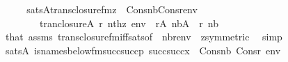 \begin{isabellebody}
%
\isadelimproof
%
\endisadelimproof
%
\isatagproof
{}\isamarkupfalse%
\ {\isacharminus}{\kern0pt}\isanewline
\ \ \isamarkupfalse%
\ {\isachardoublequoteopen}sats{\isacharparenleft}{\kern0pt}A{\isacharcomma}{\kern0pt}trans{\isacharunderscore}{\kern0pt}closure{\isacharunderscore}{\kern0pt}fm{\isacharparenleft}{\kern0pt}{}{\isacharcomma}{\kern0pt}z\ {\isacharhash}{\kern0pt}{\isacharplus}{\kern0pt}\ {}{\isacharparenright}{\kern0pt}{\isacharcomma}{\kern0pt}Cons{\isacharparenleft}{\kern0pt}nb{\isacharcomma}{\kern0pt}Cons{\isacharparenleft}{\kern0pt}r{\isacharcomma}{\kern0pt}env{\isacharparenright}{\kern0pt}{\isacharparenright}{\kern0pt}{\isacharparenright}{\kern0pt}\ {\isasymlongleftrightarrow}\isanewline
\ \ \ \ \ \ \ \ tran{\isacharunderscore}{\kern0pt}closure{\isacharparenleft}{\kern0pt}{\isacharhash}{\kern0pt}{\isacharhash}{\kern0pt}A{\isacharcomma}{\kern0pt}\ r{\isacharcomma}{\kern0pt}\ nth{\isacharparenleft}{\kern0pt}z{\isacharcomma}{\kern0pt}\ env{\isacharparenright}{\kern0pt}{\isacharparenright}{\kern0pt}{\isachardoublequoteclose}\ \ {\isachardoublequoteopen}r{\isasymin}A{\isachardoublequoteclose}\ {\isachardoublequoteopen}nb{\isasymin}A{\isachardoublequoteclose}\ \ r\ nb\isanewline
\ \ \ \ \isamarkupfalse%
\ that\ assms\ trans{\isacharunderscore}{\kern0pt}closure{\isacharunderscore}{\kern0pt}fm{\isacharunderscore}{\kern0pt}iff{\isacharunderscore}{\kern0pt}sats{\isacharbrackleft}{\kern0pt}of\ {}\ {\isachardoublequoteopen}{\isacharbrackleft}{\kern0pt}nb{\isacharcomma}{\kern0pt}r{\isacharbrackright}{\kern0pt}{\isacharat}{\kern0pt}env{\isachardoublequoteclose}\ {\isacharunderscore}{\kern0pt}\ {\isachardoublequoteopen}z{\isacharhash}{\kern0pt}{\isacharplus}{\kern0pt}{}{\isachardoublequoteclose}{\isacharcomma}{\kern0pt}symmetric{\isacharbrackright}{\kern0pt}\ \isamarkupfalse%
\ simp\isanewline
\ \ \isamarkupfalse%
\isanewline
\ \ \isamarkupfalse%
\ {\isachardoublequoteopen}sats{\isacharparenleft}{\kern0pt}A{\isacharcomma}{\kern0pt}\ is{\isacharunderscore}{\kern0pt}names{\isacharunderscore}{\kern0pt}below{\isacharunderscore}{\kern0pt}fm{\isacharparenleft}{\kern0pt}succ{\isacharparenleft}{\kern0pt}succ{\isacharparenleft}{\kern0pt}p{\isacharparenright}{\kern0pt}{\isacharparenright}{\kern0pt}{\isacharcomma}{\kern0pt}\ succ{\isacharparenleft}{\kern0pt}succ{\isacharparenleft}{\kern0pt}x{\isacharparenright}{\kern0pt}{\isacharparenright}{\kern0pt}{\isacharcomma}{\kern0pt}\ {}{\isacharparenright}{\kern0pt}{\isacharcomma}{\kern0pt}\ Cons{\isacharparenleft}{\kern0pt}nb{\isacharcomma}{\kern0pt}\ Cons{\isacharparenleft}{\kern0pt}r{\isacharcomma}{\kern0pt}\ env{\isacharparenright}{\kern0pt}{\isacharparenright}{\kern0pt}{\isacharparenright}{\kern0pt}\ {\isasymlongleftrightarrow}\isanewline

\end{isabellebody}
